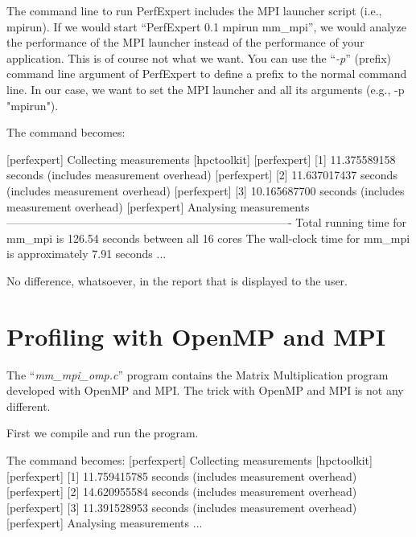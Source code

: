 \begin{prompt}
\end{prompt}

The command line to run PerfExpert includes the MPI launcher script (i.e., mpirun). If we would start ``PerfExpert 0.1 mpirun mm\_mpi'', we would analyze the performance of the MPI launcher instead of the performance of your application. This is of course not what we want. You can use the ``\textit{-p}'' (prefix) command line argument of PerfExpert to define a prefix to the normal command line. In our case, we want to set the MPI launcher and all its arguments (e.g., -p
"mpirun").

The command becomes:

\begin{prompt}
[perfexpert] Collecting measurements [hpctoolkit]
[perfexpert]    [1] 11.375589158 seconds (includes measurement overhead)
[perfexpert]    [2] 11.637017437 seconds (includes measurement overhead)
[perfexpert]    [3] 10.165687700 seconds (includes measurement overhead)
[perfexpert] Analysing measurements
----------------------------------------------------------------------------
Total running time for mm_mpi is 126.54 seconds between all 16 cores
The wall-clock time for mm_mpi is approximately 7.91 seconds
...
\end{prompt}

No difference, whatsoever, in the report that is displayed to the user.

\section{Profiling with OpenMP and MPI}
\label{sec:Profiling_with_OpenMP_MPI}

The ``\textit{mm\_mpi\_omp.c}'' program contains the Matrix Multiplication program developed with OpenMP and MPI. The trick with OpenMP and MPI is not any different.

First we compile and run the program.

\begin{prompt}
The command becomes:
[perfexpert] Collecting measurements [hpctoolkit]
[perfexpert]    [1] 11.759415785 seconds (includes measurement overhead)
[perfexpert]    [2] 14.620955584 seconds (includes measurement overhead)
[perfexpert]    [3] 11.391528953 seconds (includes measurement overhead)
[perfexpert] Analysing measurements
...
\end{prompt}

